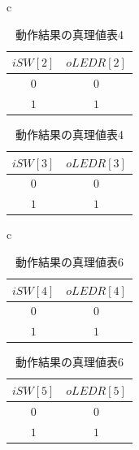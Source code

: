 \documentclass[a4paper]{jarticle}
\begin{document}
\begin{table}[!h]
	\begin{center}
		\begin{tabular}{c}
			\begin{minipage}{0.5\hsize}
				\begin{center}
					\caption{動作結果の真理値表3}
					\label{Work1TruthTable3}
					\begin{tabular}{|c|c|}
						\hline
						$iSW[2]$	&$oLEDR[2]$\\	\hline\hline
						$0$		&$0$\\		\hline
						$1$		&$1$\\		\hline
					\end{tabular}
				\end{center}
			\end{minipage}
			\begin{minipage}{0.5\hsize}
				\begin{center}
					\caption{動作結果の真理値表4}
					\label{Work1TruthTable4}
					\begin{tabular}{|c|c|}
						\hline
						$iSW[3]$	&$oLEDR[3]$\\	\hline\hline
						$0$		&$0$\\		\hline
						$1$		&$1$\\		\hline
					\end{tabular}
				\end{center}
			\end{minipage}
		\end{tabular}
	\end{center}
\end{table}
\begin{table}[!h]
	\begin{center}
		\begin{tabular}{c}
			\begin{minipage}{0.5\hsize}
				\begin{center}
					\caption{動作結果の真理値表5}
					\label{Work1TruthTable5}
					\begin{tabular}{|c|c|}
						\hline
						$iSW[4]$	&$oLEDR[4]$\\	\hline\hline
						$0$		&$0$\\		\hline
						$1$		&$1$\\		\hline
					\end{tabular}
				\end{center}
			\end{minipage}
			\begin{minipage}{0.5\hsize}
				\begin{center}
					\caption{動作結果の真理値表6}
					\label{Work2TruthTable6}
					\begin{tabular}{|c|c|}
						\hline
						$iSW[5]$	&$oLEDR[5]$\\	\hline\hline
						$0$		&$0$\\		\hline
						$1$		&$1$\\		\hline
					\end{tabular}
				\end{center}
			\end{minipage}
		\end{tabular}
	\end{center}
\end{table}
\end{document}
